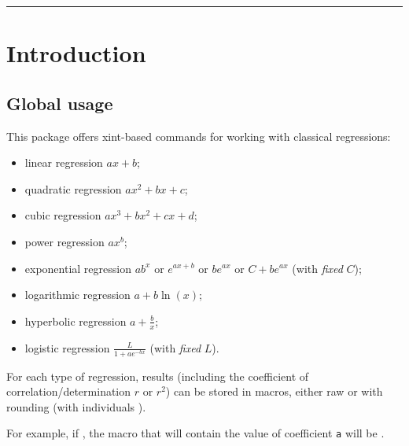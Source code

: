 \documentclass[11pt,a4paper]{ltxdoc}
\begin{document}
\vfill

\vspace*{5mm}

\pagebreak


\hypertarget{matoc}{}

\tableofcontents

\vspace*{5mm}

\hrule

\vspace*{5mm}

\pagebreak

\section{Introduction}

\subsection{Global usage}

This package offers \textsf{xint}-based commands for working with classical regressions:

\begin{itemize}
	\item linear regression $ax+b$;
	\item quadratic regression $ax^2+bx+c$;
	\item cubic regression $ax^3+bx^2+cx+d$;
	\item power regression $ax^b$;
	\item exponential regression $ab^x$ or $e^{ax+b}$ or $be^{ax}$ or $C + be^{ax}$ (with \textit{fixed} $C$);
	\item logarithmic regression $a+b\ln(x)$;
	\item hyperbolic regression $a+\displaystyle\frac{b}{x}$;
	\item logistic regression $\displaystyle\frac{L}{1 + ae^{-bx}}$ (with \textit{fixed} $L$).
\end{itemize}

For each type of regression, results (including the coefficient of correlation/determination $r$ or $r^2$) can be stored in macros, either raw or with rounding (with individuals ).

\smallskip

For example, if \MontreCode{[coeffa=xxA]}, the macro that will contain the value of coefficient \texttt{a} will be .
\end{document}
